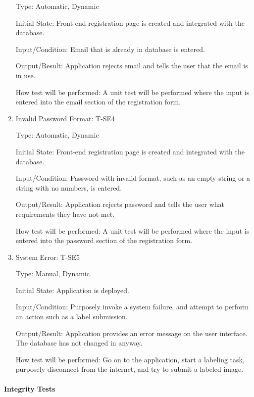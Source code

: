 \documentclass[12pt, titlepage]{article}
\begin{document}
\begin{enumerate}
Type: Automatic, Dynamic
					
Initial State: Front-end registration page is created and integrated with the database.
					
Input/Condition: Email that is already in database is entered.
					
Output/Result: Application rejects email and tells the user that the email is in use.
					
How test will be performed: A unit test will be performed where the input is entered into the email section of the registration form.

\item{Invalid Password Format: T-SE4\\}

Type: Automatic, Dynamic
					
Initial State: Front-end registration page is created and integrated with the database.
					
Input/Condition: Password with invalid format, such as an empty string or a string with no numbers, is entered.
					
Output/Result: Application rejects password and tells the user what requirements they have not met.
					
How test will be performed: A unit test will be performed where the input is entered into the password section of the registration form.

\item{System Error: T-SE5\\}

Type: Manual, Dynamic
					
Initial State: Application is deployed.
					
Input/Condition: Purposely invoke a system failure, and attempt to perform an action such as a label submission.
					
Output/Result: Application provides an error message on the user interface. The database has not changed in anyway.
					
How test will be performed: Go on to the application, start a labeling task, purposely disconnect from the internet, and try to submit a labeled image.

\end{enumerate}

\paragraph{Integrity Tests}
\end{document}
